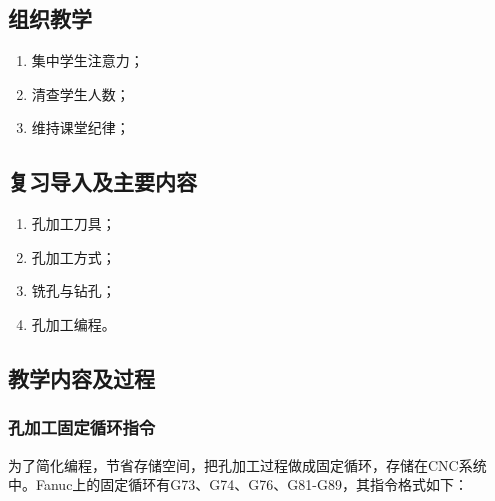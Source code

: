 \jxhj{%
	}

\makeshouye %

\subsection{组织教学}
\begin{enumerate}[\hspace{2em}1、]
	\item 集中学生注意力；
	\item 清查学生人数；
	\item 维持课堂纪律；
\end{enumerate}

\subsection{复习导入及主要内容}
\begin{enumerate}[1、]
\item 孔加工刀具；
\item 孔加工方式；
\item 铣孔与钻孔；
\item 孔加工编程。
\end{enumerate}

\subsection{教学内容及过程}
\subsubsection{孔加工固定循环指令}
为了简化编程，节省存储空间，把孔加工过程做成固定循环，存储在CNC系统中。Fanuc上的固定循环有G73、G74、G76、G81-G89，其指令格式如下：

